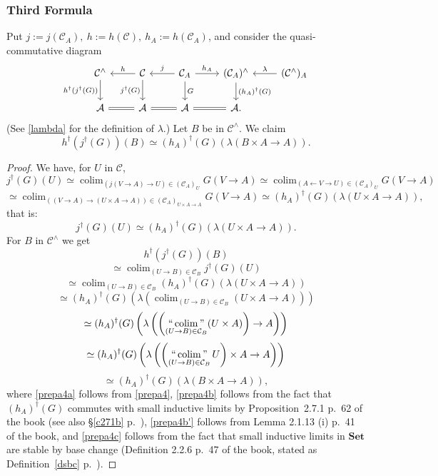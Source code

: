 \documentclass[12pt]{article}%
\theoremstyle{remark}
\theoremstyle{definition}
\newcommand{\A}{\mathcal A}
\newcommand{\C}{\mathcal C}
\newcommand{\Set}{\mathbf{Set}}%
\DeclareMathOperator*{\colim}{colim}%
\DeclareMathOperator*{\icolim}{``\colim"}
\begin{document}
% 

\subsubsection{Third Formula}

Put $j:=j(\C_A),\ h:=h(\C),\ h_A:=h(\C_A)$, and consider the quasi-commutative diagram 
$$
\begin{tikzcd}
\C^\wedge\ar{d}[swap]{h^\dagger(j^\dagger(G))}&
\C\ar{l}[swap]{h}\ar{d}[swap]{j^\dagger(G)}&
\C_A\ar{l}[swap]{j}\ar{r}{h_A}\ar{d}{G}&
(\C_A)^\wedge\ar{d}{(h_A)^\dagger(G)}&
(\C^\wedge)_A\ar{l}[swap]{\lambda}\\ 
\A\ar[equal]{r}&\A\ar[equal]{r}&\A\ar[equal]{r}&\A.
\end{tikzcd}
$$ 
(See \eqref{lambda} for the definition of $\lambda$.) Let $B$ be in $\C^\wedge$. We claim 
\begin{equation}\label{prepa3}
h^\dagger(j^\dagger(G))(B)\simeq(h_A)^\dagger(G)(\lambda(B\times A\to A)).
\end{equation} 

\begin{proof}
We have, for $U$ in $\C$, 
$$
j^\dagger(G)(U)\simeq\colim_{(j(V\to A)\to U)\in(\C_A)_U}G(V\to A)\simeq\colim_{(A\leftarrow V\to U)\in(\C_A)_U}G(V\to A)
$$
$$
\simeq\colim_{((V\to A)\to(U\times A\to A))\in(\C_A)_{U\times A\to A}}G(V\to A)\simeq(h_A)^\dagger(G)(\lambda(U\times A\to A)),
$$
that is: 
%
\begin{equation}\label{prepa4}
j^\dagger(G)(U)\simeq(h_A)^\dagger(G)(\lambda(U\times A\to A)).
\end{equation} 
%
For $B$ in $\C^\wedge$ we get 
$$
h^\dagger(j^\dagger(G))(B)
$$
$$
\simeq\colim_{(U\to B)\in\C_B}j^\dagger(G)(U)
$$ 
%
\begin{equation}\label{prepa4a}
\simeq\colim_{(U\to B)\in\C_B}(h_A)^\dagger(G)(\lambda(U\times A\to A))
\end{equation} 
\begin{equation}\label{prepa4b}
\simeq(h_A)^\dagger(G)\left(\lambda\left(\colim_{(U\to B)\in\C_B}(U\times A\to A)\right)\right)
\end{equation} 
%
\begin{equation}\label{prepa4b'}
\simeq(h_A)^\dagger(G)\left(\lambda\left(\left(\icolim_{(U\to B)\in\C_B}(U\times A)\right)\to A\right)\right)
\end{equation}
\begin{equation}\label{prepa4c}
\simeq(h_A)^\dagger(G)\left(\lambda\left(\left(\icolim_{(U\to B)\in\C_B}U\right)\times A\to A\right)\right)
\end{equation} 
%
$$
\simeq(h_A)^\dagger(G)(\lambda(B\times A\to A)),
$$ 
where 
\eqref{prepa4a} follows from \eqref{prepa4}, 
\eqref{prepa4b} follows from the fact that $(h_A)^\dagger(G)$ commutes with small inductive limits by Proposition~2.7.1 p.~62 of the book (see also \S\ref{c271b} p.~\pageref{c271b}),  
\eqref{prepa4b'} follows from Lemma 2.1.13 (i) p.~41 of the book, and 
\eqref{prepa4c} follows from the fact that small inductive limits in $\Set$ are stable by base change (Definition 2.2.6 p.~47 of the book, stated as Definition~\ref{dsbc} p.~\pageref{dsbc}). 
\end{proof}
\end{document}
